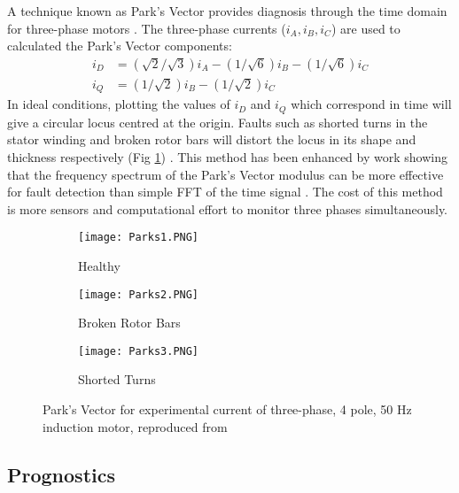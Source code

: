 A technique known as Park's Vector provides diagnosis through the time domain for three-phase motors \cite{MCSA_Parks}.
The three-phase currents ($i_A, i_B, i_C$) are used to calculated the Park's Vector components:
\begin{align}
    i_D &= (\sqrt{2}/\sqrt{3})i_A - (1/\sqrt{6})i_B - (1/\sqrt{6})i_C\\
    i_Q &= (1/\sqrt{2})i_B - (1/\sqrt{2})i_C
\end{align}
In ideal conditions, plotting the values of $i_D$ and $i_Q$ which correspond in time will give a circular locus centred at the origin.
Faults such as shorted turns in the stator winding and broken rotor bars will distort the locus in its shape and thickness respectively (Fig \ref{fig:ParksVector}) \cite{MCSA_Parks}\cite{MCSA_Parks2}.
This method has been enhanced by work showing that the frequency spectrum of the Park's Vector modulus can be more effective for fault detection than simple FFT of the time signal \cite{MCSA_Parks_Extended}.
The cost of this method is more sensors and computational effort to monitor three phases simultaneously.

\begin{figure}
  \centering
  \begin{subfigure}[b]{0.285\textwidth}
    \texttt{[image: Parks1.PNG]}
    \caption{Healthy}
  \end{subfigure}
  \begin{subfigure}[b]{0.294\textwidth}
    \texttt{[image: Parks2.PNG]}
    \caption{Broken Rotor Bars}
  \end{subfigure}
  \begin{subfigure}[b]{0.285\textwidth}
    \texttt{[image: Parks3.PNG]}
    \caption{Shorted Turns}
  \end{subfigure}
  \caption{Park's Vector for experimental current of three-phase, 4 pole, 50 Hz induction motor, reproduced from \cite{MCSA_Parks}\cite{MCSA_Parks2}}
  \label{fig:ParksVector}
\end{figure}

\subsection{Prognostics}\label{sec:prog}

